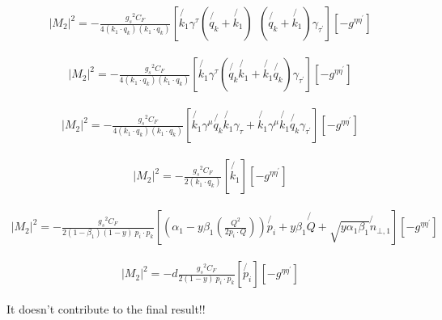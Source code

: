 \begin{equation}
\begin{split}
|M_2|^2=-\frac{{g_s}^2 C_F}{4(k_1 \cdot q_k)(k_1 \cdot q_k)}[\not{k_1}{\gamma}^{\tau}(\not{q_k}+\not{k_1})\:\:(\not{q_k}+\not{k_1}) {\gamma}_{{\tau}^{\prime}}][-g^{{\eta}{\eta}^{\prime}}]
\end{split}
\end{equation}

\begin{equation}
\begin{split}
|M_2|^2=-\frac{{g_s}^2 C_F}{4(k_1 \cdot q_k)(k_1 \cdot q_k)}[\not{k_1}{\gamma}^{\tau}(\not{q_k}\not{k_1}+\not{k_1}\not{q_k}) {\gamma}_{{\tau}^{\prime}}][-g^{{\eta}{\eta}^{\prime}}]
\end{split}
\end{equation}

\begin{equation}
\begin{split}
|M_2|^2=-\frac{{g_s}^2 C_F}{4(k_1 \cdot q_k)(k_1 \cdot q_k)}
[\not{k_1}{\gamma}^{\mu}\not{q_k}\not{k_1}{\gamma}_{{\tau}}+\not{k_1}{\gamma}^{\mu}\not{k_1}\not{q_k} {\gamma}_{{\tau}^{\prime}}][-g^{{\eta}{\eta}^{\prime}}]
\end{split}
\end{equation}

\begin{equation}
\begin{split}
|M_2|^2=-\frac{{g_s}^2 C_F}{2(k_1 \cdot q_k)}
[\not{k_1}][-g^{{\eta}{\eta}^{\prime}}]
\end{split}
\end{equation}

\begin{equation}
\begin{split}
|M_2|^2=-\frac{{g_s}^2 C_F}{2(1-\beta_1) (1-y)\:p_i \cdot p_k}
[(\alpha_1 -y\beta_1(\frac{Q^2}{2p_i \cdot Q})) \not{p_i} + y\beta_1\not{Q} + \sqrt{y\alpha_1\beta_1}\not{n}_{\bot,1}][-g^{{\eta}{\eta}^{\prime}}]
\end{split}
\end{equation}

\begin{equation}
\begin{split}
|M_2|^2=-d\frac{{g_s}^2 C_F}{2 (1-y)\:p_i \cdot p_k}
[ \not{p_i}][-g^{{\eta}{\eta}^{\prime}}]
\end{split}
\end{equation}

It doesn't contribute to the final result!!

